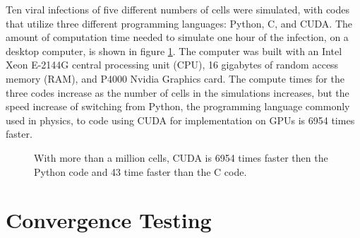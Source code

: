 Ten viral infections of five different numbers of cells were simulated, with codes that utilize three different programming languages: Python, C, and CUDA. The amount of computation time needed to simulate one hour of the infection, on a desktop computer, is shown in figure \ref{fig:SpeedComparison}. The computer was built with an Intel Xeon E-2144G central processing unit (CPU), 16 gigabytes of random access memory (RAM), and P4000 Nvidia Graphics card. The compute times for the three codes increase as the number of cells in the simulations increases, but the speed increase of switching from Python, the programming language commonly used in physics, to code using CUDA for implementation on GPUs is 6954 times faster.
\begin{figure}
    \centering
\caption{With more than a million cells, CUDA is 6954 times faster then the Python code and 43 time faster than the C code. \label{fig:SpeedComparison}}
\end{figure}

\section{Convergence Testing}

